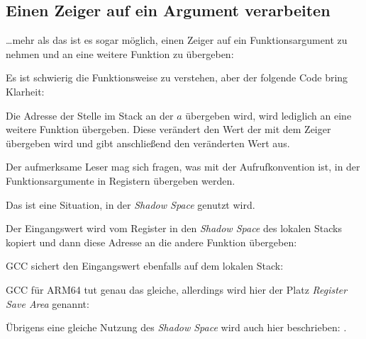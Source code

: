 \subsection{Einen Zeiger auf ein Argument verarbeiten}
\label{pointer_to_argument}

\dots mehr als das ist es sogar möglich, einen Zeiger auf ein Funktionsargument
zu nehmen und an eine weitere Funktion zu übergeben:



Es ist schwierig die Funktionsweise zu verstehen, aber der folgende Code bring Klarheit:



Die Adresse der Stelle im Stack an der $a$ übergeben wird, wird lediglich an eine
weitere Funktion übergeben.
Diese verändert den Wert der mit dem Zeiger übergeben wird und \printf gibt anschließend
den veränderten Wert aus.

\par Der aufmerksame Leser mag sich fragen, was mit der Aufrufkonvention ist, in der
Funktionsargumente in Registern übergeben werden.

Das ist eine Situation, in der \emph{Shadow Space} genutzt wird.

Der Eingangswert wird vom Register in den \emph{Shadow Space} des lokalen Stacks
kopiert und dann diese Adresse an die andere Funktion übergeben:



GCC sichert den Eingangswert ebenfalls auf dem lokalen Stack:



GCC für ARM64 tut genau das gleiche, allerdings wird hier der Platz \emph{Register Save Area} genannt:



Übrigens eine gleiche Nutzung des \emph{Shadow Space} wird auch hier beschrieben: .
